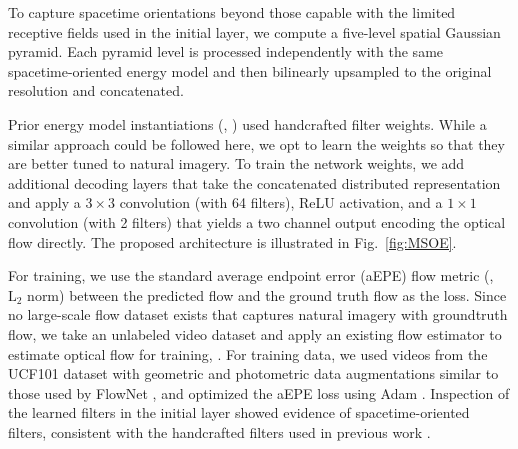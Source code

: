 To capture spacetime orientations beyond those capable
with the limited receptive fields used in the initial
layer, we compute a five-level spatial Gaussian pyramid.
Each pyramid level is
processed independently
with the same spacetime-oriented energy model and then
bilinearly upsampled to the original resolution and
concatenated.

Prior energy model instantiations (\eg,
\cite{adelson1985spatiotemporal,derpanis2012spacetime,simoncelli1998})
used handcrafted filter weights.
While a similar approach could be followed here, we
opt to learn the weights so that they are better
tuned to natural imagery.
To train the network weights, we add additional decoding
layers that take the concatenated distributed
representation and apply a $3\times 3$ convolution
(with 64 filters), ReLU activation, and a $1\times 1$
convolution (with 2 filters) that yields a two channel
output encoding the optical flow directly.
The proposed architecture is illustrated in
Fig.\ \ref{fig:MSOE}.



For training, we use the standard average
endpoint error (aEPE) flow metric (\ie, $\text{L}_2$
norm) between the predicted flow and the ground truth
flow as the loss.
Since no large-scale flow dataset exists that captures
natural imagery with groundtruth flow, we take an
unlabeled video dataset and apply an existing flow
estimator \cite{revaud2015epicflow} to estimate optical
flow for training,
\cf \cite{tran2016}.
For training data, we used videos from the UCF101
dataset \cite{soomro2012ucf101} with geometric
and photometric data augmentations similar to those used
by FlowNet \cite{dosovitskiy2015}, and optimized the aEPE loss using
Adam \cite{kingma2017}.
Inspection of the learned filters in the initial layer
showed evidence of spacetime-oriented filters, consistent with
the handcrafted filters used in previous work \cite{derpanis2012spacetime}.

